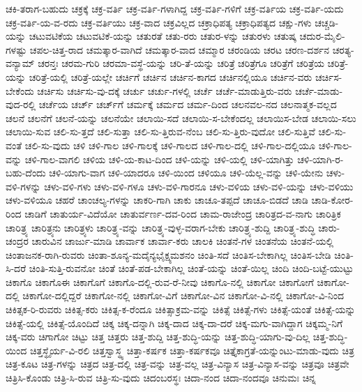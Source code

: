 {ಚಕಿ-ತರಾಗ-ಬಹುದು
ಚಕ್ರಕ್ಕೆ
ಚಕ್ರ-ವರ್ತಿ
ಚಕ್ರ-ವರ್ತಿ-ಗಳಾಗಿದ್ದ
ಚಕ್ರ-ವರ್ತಿ-ಗಳಿಗೆ
ಚಕ್ರ-ವರ್ತಿಯ
ಚಕ್ರ-ವರ್ತಿ-ಯದು
ಚಕ್ರ-ವರ್ತಿ-ಯ-ವ-ರದು
ಚಕ್ರ-ವರ್ತಿಯು
ಚಕ್ರ-ವಾದ
ಚಕ್ರವಿಲ್ಲದ
ಚಕ್ರಾಧಿಪತ್ಯ
ಚಕ್ರಾಧಿಪತ್ಯದ
ಚಕ್ಷು-ಗಳು
ಚಚ್ಚಡಿ-ಯನ್ನು
ಚಟುವಟಿಕೆಯ
ಚಟುವಟಿಕೆ-ಯನ್ನು
ಚತುರತೆ
ಚತು-ರರು
ಚತುರ-ಳನ್ನು
ಚತುರಳು
ಚತುಷ್ಕ
ಚದುರ-ಮೈಲಿ-ಗಳಷ್ಟು
ಚಪಲ-ಚಿತ್ತ-ರಾದ
ಚಮತ್ಕಾರ-ವಾಗಿದೆ
ಚಮತ್ಕಾರ-ವಾದ
ಚಮ್ಮಾರ
ಚರಂಡಿಯ
ಚರಟ
ಚರಣ-ದರ್ಶನ
ಚರತ್ಯ-ವನ್ಯಾಮ್
ಚರನ್ತಃ
ಚರಮ-ಗುರಿ
ಚರಮಾ-ವಸ್ಥೆ-ಯನ್ನು
ಚರಿ-ತೆ-ಯನ್ನು
ಚರಿತ್ರೆ
ಚರಿತ್ರೆಗೂ
ಚರಿತ್ರೆಗೆ
ಚರಿತ್ರೆಯ
ಚರಿತ್ರೆ-ಯನ್ನು
ಚರಿತ್ರೆ-ಯಲ್ಲಿ
ಚರಿತ್ರೆ-ಯಲ್ಲೇ
ಚರ್ಚಿಗೆ
ಚರ್ಚಿನ
ಚರ್ಚಿನ-ಕಾಗದ
ಚರ್ಚಿನಲ್ಲಿಯೂ
ಚರ್ಚಿನ-ವರು
ಚರ್ಚಿಸ-ಬೇಕೆಂದು
ಚರ್ಚಿಸು
ಚರ್ಚಿಸು-ವು-ದಕ್ಕೆ
ಚರ್ಚು
ಚರ್ಚು-ಗಳಲ್ಲಿ
ಚರ್ಚೆ
ಚರ್ಚೆ-ಮಾಡುತ್ತಿರು-ವರು
ಚರ್ಚೆ-ಮಾಡು-ವುದ-ರಲ್ಲಿ
ಚರ್ಚೆಯ
ಚರ್ಚ್
ಚರ್ಚ್‌ಗೆ
ಚರ್ಮಕ್ಕೆ
ಚರ್ಮದ
ಚರ್ಮ-ದಿಂದ
ಚಲನವಲ-ನದ
ಚಲನಾತ್ಮಕ-ವಲ್ಲದ
ಚಲನೆ
ಚಲನೆಗೆ
ಚಲನೆ-ಯನ್ನು
ಚಲನೆಯೇ
ಚಲಾಯಿ-ಸದೆ
ಚಲಾಯಿ-ಸ-ಬೇಕೆಂದಲ್ಲ
ಚಲಾಯಿಸ-ಬೇಡ
ಚಲಾಯಿ-ಸಲು
ಚಲಾಯಿ-ಸುವ
ಚಲಿ-ಸು-ತ್ತದೆ
ಚಲಿ-ಸುತ್ತಾ
ಚಲಿ-ಸು-ತ್ತಿರುವ-ನೆಂಬ
ಚಲಿ-ಸು-ತ್ತಿರು-ವುದೋ
ಚಲಿ-ಸುತ್ತಿವೆ
ಚಲಿ-ಸು-ವಂತೆ
ಚಲಿ-ಸು-ವುದು
ಚಳಿ
ಚಳಿ-ಗಾಲ
ಚಳಿ-ಗಾಲಕ್ಕೆ
ಚಳಿ-ಗಾಲದ
ಚಳಿ-ಗಾಲ-ದಲ್ಲಿ
ಚಳಿ-ಗಾಲ-ದಲ್ಲಿಯೂ
ಚಳಿ-ಗಾಲ-ವನ್ನು
ಚಳಿ-ಗಾಲ-ವಾಗಲಿ
ಚಳಿಯ
ಚಳಿ-ಯ-ಕಾಟ-ದಿಂದ
ಚಳಿ-ಯನ್ನು
ಚಳಿ-ಯಲ್ಲಿ
ಚಳಿ-ಯಾಗಿತ್ತು
ಚಳಿ-ಯಾಗಿ-ರ-ಬಹು-ದೆಂದು
ಚಳಿ-ಯಾಗು-ವಾಗ
ಚಳಿ-ಯಾದರೂ
ಚಳಿ-ಯಿಂದ
ಚಳಿಯೂ
ಚಳಿ-ಯೆಲ್ಲ-ವನ್ನು
ಚಳಿ-ಯೇನು
ಚಳು-ವಳಿ-ಗಳನ್ನು
ಚಳು-ವಳಿ-ಗಳು
ಚಳು-ವಳಿ-ಗಳೂ
ಚಳು-ವಳಿ-ಗಾರನೂ
ಚಳು-ವಳಿಯ
ಚಳು-ವಳಿ-ಯನ್ನು
ಚಳು-ವಳಿಯು
ಚಳು-ವಳಿಯೂ
ಚಹರೆ
ಚಾಂಚಲ್ಯ-ಗಳನ್ನು
ಚಾಕರಿ-ಗಾಗಿ
ಚಾಕು
ಚಾಚೂ-ತಪ್ಪದೆ
ಚಾಚೂ-ಬಿಡದೆ
ಚಾಡಿ
ಚಾಡಿ-ಕೋರ-ರಿಂದ
ಚಾಡಿಗೆ
ಚಾತುರ್ಯ-ವಿದೆಯೋ
ಚಾತುರ್ವರ್ಣ-ದವ-ರಿಂದ
ಚಾಮ-ರಾಜೇಂದ್ರ
ಚಾರಿತ್ರದ-ವ-ನಾಗು
ಚಾರಿತ್ರಿಕ
ಚಾರಿತ್ರ್ಯ
ಚಾರಿತ್ರ್ಯನು
ಚಾರಿತ್ರ್ಯಳು
ಚಾರಿತ್ರ್ಯ-ವನ್ನು
ಚಾರಿತ್ರ್ಯ-ವುಳ್ಳ-ವರಾಗ-ಬೇಕು
ಚಾರಿತ್ರ್ಯ-ಶುದ್ದಿ
ಚಾರಿತ್ರ್ಯ-ಶುದ್ಧಿ
ಚಾರು-ಚಂದ್ರರ
ಚಾರುವಿನ
ಚಾರ್ಜು-ಮಾಡಿ
ಚಾರ್ವಾಕ
ಚಾರ್ವಾ-ಕರು
ಚಾಲಕಿ
ಚಿಂತನೆ-ಗಳ
ಚಿಂತನೆಯ
ಚಿಂತನೆ-ಯಲ್ಲಿ
ಚಿಂತಾಜನಕ-ರಾಗಿ-ರುವರು
ಚಿಂತಾ-ಶೂನ್ಯ-ಮದೈನ್ಯಭೈಕ್ಷ್ಯಮಶನಂ
ಚಿಂತಿ-ಸದೆ
ಚಿಂತಿಸ-ಬೇಕಾಗಿಲ್ಲ
ಚಿಂತಿಸ-ಬೇಡಿ
ಚಿಂತಿ-ಸಿ-ದರೆ
ಚಿಂತಿ-ಸುತ್ತಿ-ರುವನೋ
ಚಿಂತೆ
ಚಿಂತೆ-ಪಡ-ಬೇಕಾಗಿಲ್ಲ
ಚಿಂತೆ-ಯನ್ನು
ಚಿಂತೆ-ಯಿಲ್ಲ
ಚಿಂದಿ
ಚಿಂದಿ-ಬಟ್ಟೆ-ಯುಟ್ಟು
ಚಿಕಾಗೊ
ಚಿಕಾಗೊಈ
ಚಿಕಾಗೊಗೆ
ಚಿಕಾಗೊ-ದಲ್ಲಿ-ರುವ-ರೆ-ನೀವು
ಚಿಕಾಗೊ-ನಲ್ಲಿ
ಚಿಕಾಗೋ
ಚಿಕಾಗೋಗೆ
ಚಿಕಾಗೋ-ದಲ್ಲಿ
ಚಿಕಾಗೋ-ದಲ್ಲಿದ್ದರೆ
ಚಿಕಾಗೋ-ನಲ್ಲಿ
ಚಿಕಾಗೋ-ವಿಗೆ
ಚಿಕಾಗೋ-ವಿನ
ಚಿಕಾಗೋ-ವಿ-ನಲ್ಲಿ
ಚಿಕಾಗೋ-ವಿ-ನಿಂದ
ಚಿಕಿತ್ಸಕ-ರಿ-ರುವರು
ಚಿಕಿತ್ಸ-ಕರು
ಚಿಕಿತ್ಸ-ಕ-ರೆಂದೂ
ಚಿಕಿತ್ಸಾಕ್ರಮ-ವನ್ನು
ಚಿಕಿತ್ಸೆ
ಚಿಕಿತ್ಸೆ-ಗಳು
ಚಿಕಿತ್ಸೆ-ಯಂತೆ
ಚಿಕಿತ್ಸೆ-ಯನ್ನು
ಚಿಕಿತ್ಸೆ-ಯಲ್ಲಿ
ಚಿಕಿತ್ಸೆ-ಯೊಂದಿದೆ
ಚಿಕ್ಕ
ಚಿಕ್ಕ-ದನ್ನಾಗಿ
ಚಿಕ್ಕ-ದಾದ
ಚಿಕ್ಕ-ದಾ-ದರೆ
ಚಿಕ್ಕ-ಮಗು-ವಾಗಿದ್ದಾಗ
ಚಿಕ್ಕಮ್ಮ-ನಿಗೆ
ಚಿಕ್ಕ-ವರು
ಚಿಗಾಗೋ
ಚಿಟ್ಟು
ಚಿತ್ತ
ಚಿತ್ತರು
ಚಿತ್ತ-ಶುದ್ದಿ
ಚಿತ್ತ-ಶುದ್ಧಿ-ಯನ್ನು
ಚಿತ್ತ-ಶುದ್ಧಿ-ಯಾಗು-ವು-ದಿಲ್ಲ
ಚಿತ್ತ-ಶುದ್ಧಿ-ಯಿಂದ
ಚಿತ್ತಸ್ಥೈರ್ಯ-ವಿ-ರಲಿ
ಚಿತ್ತಸ್ವಾಸ್ಥ್ಯ
ಚಿತ್ತಾ-ಕರ್ಷಕ
ಚಿತ್ತಾ-ಕರ್ಷಕವೂ
ಚಿತ್ತೈಕಾಗ್ರತೆ-ಯನ್ನುಂಟು-ಮಾಡು-ವುದು
ಚಿತ್ರ
ಚಿತ್ರ-ಕೂಟ
ಚಿತ್ರ-ಗಳನ್ನು
ಚಿತ್ರದ
ಚಿತ್ರ-ದಲ್ಲಿ
ಚಿತ್ರ-ವನ್ನು
ಚಿತ್ರ-ವಲ್ಲ
ಚಿತ್ರ-ವಿನ್ಯಾಸ
ಚಿತ್ರ-ವಿನ್ಯಾಸ-ವನ್ನು
ಚಿತ್ರವೂ
ಚಿತ್ರವೇ
ಚಿತ್ರಿಸಿ-ಕೊಂಡು
ಚಿತ್ರಿ-ಸಿ-ರುವ
ಚಿತ್ರಿ-ಸು-ವುದು
ಚಿದಂಬರಸ್ಥಃ
ಚಿದಾ-ನಂದ
ಚಿದಾ-ನಂದವೂ
ಚಿನುಮಃ
ಚಿನ್ನ
}
